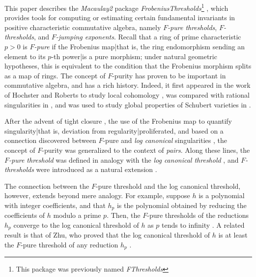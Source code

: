 \documentclass{amsart}
\begin{document}
This paper describes the \emph{Macaulay2} package \emph{FrobeniusThresholds}\footnote{This package was previously named \emph{FThresholds}} \cite{M2, FThresholdsPackage}, which provides tools for computing or estimating certain fundamental invariants in positive characteristic commutative algebra, namely \emph{$F$-pure thresholds}, \emph{$F$-thresholds}, and \emph{$F$-jumping exponents}.
Recall that a ring of prime characteristic $p>0$ is \emph{$F$-pure} if the Frobenius map|that is, the ring endomorphism sending an element to its $p$-th power|is a pure morphism;  under natural geometric hypotheses, this is equivalent to the condition that the Frobenius morphism splits as a map of rings.
The concept of $F$-purity has proven to be important in commutative algebra, and has a rich history.
Indeed, it first appeared in the work of Hochster and Roberts to study local cohomology \cite{HochsterRobertsFrobeniusLocalCohomology}, was compared with rational singularities in  \cite{FedderFPureRat}, and was used to study global properties of Schubert varieties in \cite{MehtaRamanathanFrobeniusSplittingAndCohomologyVanishing}.

After the advent of tight closure \cite{HochsterHunekeTC1}, the use of the Frobenius map to quantify singularity|that is, deviation from regularity|proliferated, and based on a connection discovered between $F$-pure and \emph{log canonical} singularities \cite{HaraWatanabeFRegFPure}, the concept of $F$-purity was generalized to the context of \emph{pairs}.
Along these lines, the \emph{$F$-pure threshold} was defined in analogy with the \emph{log canonical threshold} \cite{TakagiWatanabeFPureThresh}, and \emph{$F$-thresholds} were introduced as a natural extension \cite{MustataTakagiWatanabeFThresholdsAndBernsteinSato}.

The connection between the $F$-pure threshold and the log canonical threshold, however, extends beyond mere analogy.
For example, suppose $h$ is a polynomial with integer coefficients, and that $h_p$ is the polynomial obtained by reducing the coefficients of $h$ modulo a prime $p$.  Then, the $F$-pure thresholds of the reductions $h_p$ converge to the log canonical threshold of $h$ as $p$ tends to infinity \cite{HaraYoshidaGeneralizationOfTightClosure}.
A related result is that of Zhu, who proved that the log canonical threshold of $h$ is at least the $F$-pure threshold of any reduction $h_p$ \cite[Corollary 4.2]{ZhuLogCanoincalThresholdsInPositiveChar}.
\end{document}
